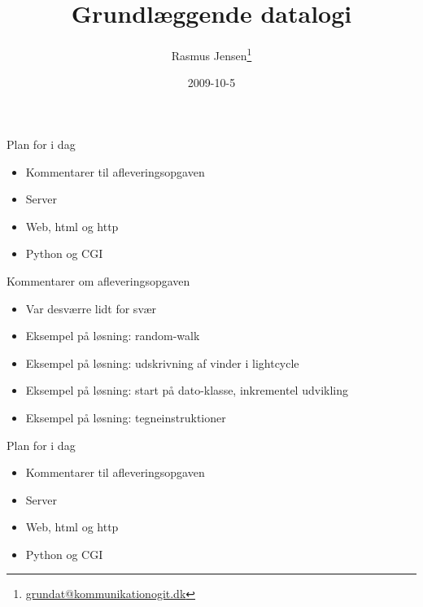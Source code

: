 \documentclass[a4paper,landscape]{slides}
\title{Grundlæggende datalogi}
\author{Rasmus Jensen\footnote{\url{grundat@kommunikationogit.dk}}}
\date{2009-10-5}
\begin{document}
\maketitle

\begin{comment}
 - opsamling/repetition
 - afleveringsopgaven
 - kommandoprompt, ssh, tilgang til server etc.
 - repetition http, introduktion til cgi
 - opsamling om html, forms, strukturerede data
\end{comment}

\begin{slide}
	\begin{center} {\large 
            Plan for i dag
	} \end{center}
	\begin{itemize} \addtolength{\itemsep}{-\baselineskip}
		\item Kommentarer til afleveringsopgaven
		\item Server
		\item Web, html og http
		\item Python og CGI
	\end{itemize}
\end{slide}

\begin{slide}
	\begin{center} {\large 
            Kommentarer om afleveringsopgaven
	} \end{center}
	\begin{itemize} \addtolength{\itemsep}{-\baselineskip}
                \item Var desværre lidt for svær
                \item Eksempel på løsning: random-walk
                \item Eksempel på løsning: udskrivning af vinder i lightcycle
                \item Eksempel på løsning: start på dato-klasse, inkrementel udvikling
                \item Eksempel på løsning: tegneinstruktioner
	\end{itemize}
\end{slide}

\begin{slide}
	\begin{center} {\large 
            Plan for i dag
	} \end{center}
	\begin{itemize} \addtolength{\itemsep}{-\baselineskip}
		\item Kommentarer til afleveringsopgaven
		\item Server
		\item Web, html og http
		\item Python og CGI
	\end{itemize}
\end{slide}
\end{document}
